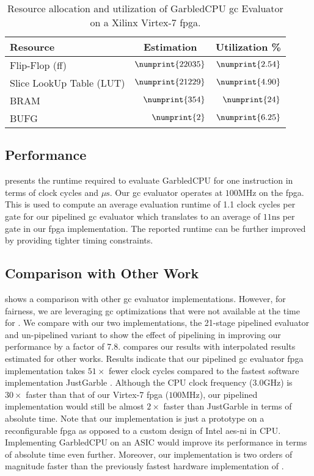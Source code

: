 \begin{table}[ht]
\centering
\caption{Resource allocation and utilization of GarbledCPU \acrshort{gc} Evaluator on a Xilinx Virtex-7 \acrshort{fpga}.}
\label{table:resource}
\begin{tabular}{l|r|r}
Resource    & \multicolumn{1}{c|}{Estimation} & \multicolumn{1}{c}{Utilization \%} \\ \hline \hline
Flip-Flop (\acrshort{ff}) & $\numprint{22035}$ & $\numprint{2.54}$ \\ \hline
Slice LookUp Table (LUT) & $\numprint{21229}$ & $\numprint{4.90}$ \\ \hline
BRAM & $\numprint{354}$ & $\numprint{24}$
\\ \hline
BUFG & $\numprint{2}$ & $\numprint{6.25}$
 \end{tabular}
\end{table}

\subsection{Performance}  presents the runtime required to evaluate GarbledCPU for one instruction in terms of clock cycles and $\mu\textrm{s}$. Our \acrshort{gc} evaluator operates at $100\textrm{MHz}$ on the \acrshort{fpga}. This is used to compute an average evaluation runtime of 1.1 clock cycles per gate for our pipelined \acrshort{gc} evaluator which translates to an average of $11\textrm{ns}$ per gate in our \acrshort{fpga} implementation. The reported runtime can be further improved by providing tighter timing constraints.

\subsection{Comparison with Other Work}
 shows a comparison with other \acrshort{gc} evaluator implementations. However, for fairness, we are leveraging \acrshort{gc} optimizations that were not available at the time for \cite{jarvinen2010garbled}. We compare with our two implementations, the 21-stage pipelined evaluator and un-pipelined variant to show the effect of pipelining in improving our performance by a factor of 7.8.  compares our results with interpolated results estimated for other works. Results indicate that our pipelined \acrshort{gc} evaluator \acrshort{fpga} implementation takes $51\times$ fewer clock cycles compared to the fastest software implementation JustGarble \cite{bellare2013efficient}. Although the CPU clock frequency ($3.0\textrm{GHz}$) is $30\times$ faster than that of our Virtex-7 \acrshort{fpga} ($100\textrm{MHz}$), our pipelined implementation would still be almost $2\times$ faster than JustGarble in terms of absolute time. Note that our implementation is just a prototype on a reconfigurable \acrshort{fpga} as opposed to a custom design of Intel \acrshort{aes-ni} in CPU. Implementing GarbledCPU on an ASIC would improve its performance in terms of absolute time even further. Moreover, our implementation is two orders of magnitude faster than the previously fastest hardware implementation of \cite{jarvinen2010garbled}.

